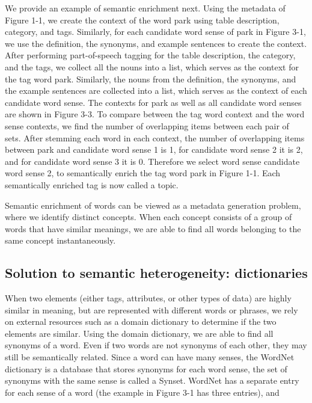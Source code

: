 We provide an example of semantic enrichment next. Using the metadata of Figure 1-1, we create the context of the word park using table description, category, and tags. Similarly, for each candidate word sense of park in Figure 3-1, we use the definition, the synonyms, and example sentences to create the context. After performing part-of-speech tagging for the table description, the category, and the tags, we collect all the nouns into a list, which serves as the context for the tag word park. Similarly, the nouns from the definition, the synonyms, and the example sentences are collected into a list, which serves as the context of each candidate word sense. The contexts for park as well as all candidate word senses are shown in Figure 3-3.
To compare between the tag word context and the word sense contexts, we find the number of overlapping items between each pair of sets. After stemming each word in each context, the number of overlapping items between park and candidate word sense 1 is 1, for candidate word sense 2 it is 2, and for candidate word sense 3 it is 0. Therefore we select word sense candidate word sense 2, to semantically enrich the tag word park in Figure 1-1. Each semantically enriched tag is now called a topic.

Semantic enrichment of words can be viewed as a metadata generation problem, where we identify distinct concepts. When each concept consists of a group of words that have similar meanings, we are able to find all words belonging to the same concept instantaneously.

\subsection{Solution to semantic heterogeneity: dictionaries}
\label{ssec:SolutionToSemanticHeterogeneityDdictionaries}

When two elements (either tags, attributes, or other types of data) are highly similar in meaning, but are represented with different words or phrases, we rely on external resources such as a domain dictionary to determine if the two elements are similar. Using the domain dictionary, we are able to find all synonyms of a word. Even if two words are not synonyms of each other, they may still be semantically related.
Since a word can have many senses, the WordNet dictionary is a database that stores synonyms for each word sense, the set of synonyms with the same sense is called a Synset. WordNet has a separate entry for each sense of a word (the example in Figure 3-1 has three entries), and


